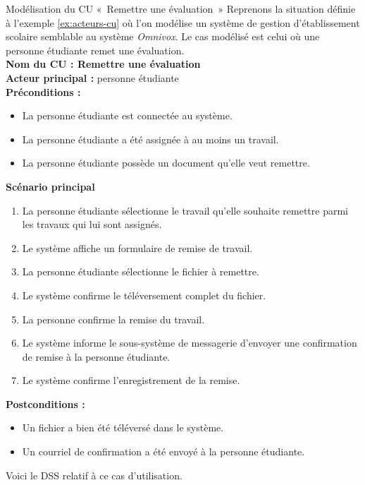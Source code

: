\begin{exemple}[label={ex:modelisation-cu-1}]{Modélisation du CU «~Remettre une évaluation~» }
	Reprenons la situation définie à l'exemple \ref{ex:acteurs-cu} où l'on modélise un système de gestion d'établissement scolaire semblable au système {\itshape Omnivox}. Le cas modélisé est celui où une personne étudiante remet une évaluation. \\
	
	{\bfseries \Large Nom du CU : Remettre une évaluation}\\[6pt]
	{\bfseries Acteur principal : } personne étudiante\\[6pt]
	{\bfseries Préconditions : }
	\begin{itemize}
		\item La personne étudiante est connectée au système.
		\item La personne étudiante a été assignée à au moins un travail.
		\item La personne étudiante possède un document qu'elle veut remettre.
	\end{itemize} 
	{\bfseries Scénario principal}
	\begin{enumerate}
		\item La personne étudiante sélectionne le travail qu'elle souhaite remettre parmi les travaux qui lui sont assignés.
		\item Le système affiche un formulaire de remise de travail.
		\item La personne étudiante sélectionne le fichier à remettre.
		\item Le système confirme le téléversement complet du fichier.
		\item La personne confirme la remise du travail.
		\item Le système informe le sous-système de messagerie d'envoyer une confirmation de remise à la personne étudiante.
		\item Le système confirme l'enregistrement de la remise.
	\end{enumerate}
	{\bfseries Postconditions : }
	\begin{itemize}
		\item Un fichier a bien été téléversé dans le système.
		\item Un courriel de confirmation a été envoyé à la personne étudiante.
	\end{itemize} 
	
	Voici le \gls{DSS} relatif à ce cas d'utilisation.
	
	\pagebreak
	

\end{exemple}
